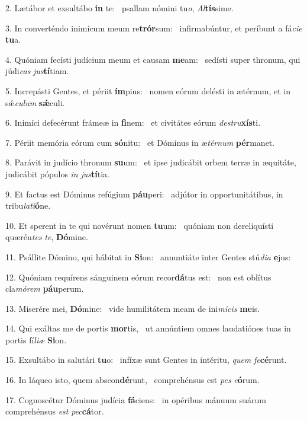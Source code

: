 2. Lætábor et exsultábo \textbf{in} te: \ast\  psallam nómini tu\textit{o}, \textit{Al}\textbf{tís}sime.\

3. In converténdo inimícum meum re\textbf{trór}sum: \ast\  infirmabúntur, et períbunt a fá\textit{ci}\textit{e} \textbf{tu}a.\

4. Quóniam fecísti judícium meum et causam \textbf{me}am: \ast\  sedísti super thronum, qui júdi\textit{cas} \textit{jus}\textbf{tí}tiam.\

5. Increpásti Gentes, et périit \textbf{ím}pius: \ast\  nomen eórum delésti in ætérnum, et in sǽ\textit{cu}\textit{lum} \textbf{sǽ}culi.\

6. Inimíci defecérunt frámeæ in \textbf{fi}nem: \ast\  et civitátes eórum \textit{de}\textit{stru}\textbf{xís}ti.\

7. Périit memória eórum cum \textbf{só}nitu: \ast\  et Dóminus in æ\textit{tér}\textit{num} \textbf{pér}manet.\

8. Parávit in judício thronum \textbf{su}um: \ast\  et ipse judicábit orbem terræ in æquitáte, judicábit pópulos \textit{in} \textit{jus}\textbf{tí}tia.\

9. Et factus est Dóminus refúgium \textbf{páu}peri: \ast\  adjútor in opportunitátibus, in tribu\textit{la}\textit{ti}\textbf{ó}ne.\

10. Et sperent in te qui novérunt nomen \textbf{tu}um: \ast\  quóniam non dereliquísti quærén\textit{tes} \textit{te}, \textbf{Dó}mine.\

11. Psállite Dómino, qui hábitat in \textbf{Si}on: \ast\  annuntiáte inter Gentes stú\textit{di}\textit{a} \textbf{e}jus:\

12. Quóniam requírens sánguinem eórum recor\textbf{dá}tus est: \ast\  non est oblítus cla\textit{mó}\textit{rem} \textbf{páu}perum.\

13. Miserére mei, \textbf{Dó}mine: \ast\  vide humilitátem meam de ini\textit{mí}\textit{cis} \textbf{me}is.\

14. Qui exáltas me de portis \textbf{mor}tis, \ast\  ut annúntiem omnes laudatiónes tuas in portis fí\textit{li}\textit{æ} \textbf{Si}on.\

15. Exsultábo in salutári \textbf{tu}o: \ast\  infíxæ sunt Gentes in intéritu, \textit{quem} \textit{fe}\textbf{cé}runt.\

16. In láqueo isto, quem abscon\textbf{dé}runt, \ast\  comprehénsus est \textit{pes} \textit{e}\textbf{ó}rum.\

17. Cognoscétur Dóminus judícia \textbf{fá}ciens: \ast\  in opéribus mánuum suárum comprehénsus \textit{est} \textit{pec}\textbf{cá}tor.\

